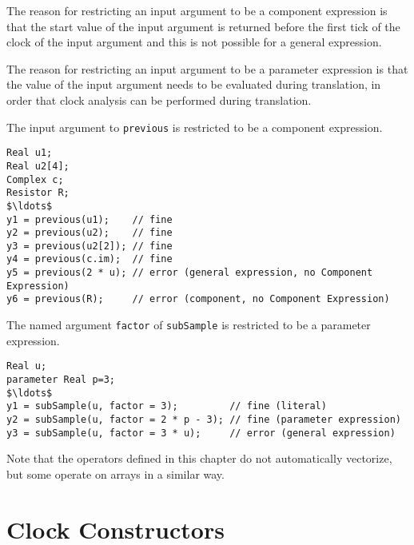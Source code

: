 \begin{nonnormative}
The reason for restricting an input argument to be a component expression is that the start value of the input argument is returned before the first tick of the clock of the input argument and this
is not possible for a general expression.

The reason for restricting an input argument to be a parameter expression is that the value of the input argument needs to be evaluated during translation, in order that clock analysis can be performed during translation.
\end{nonnormative}

\begin{example}
The input argument to \lstinline!previous! is restricted to be a component expression.
\begin{lstlisting}[language=modelica]
Real u1;
Real u2[4];
Complex c;
Resistor R;
$\ldots$
y1 = previous(u1);    // fine
y2 = previous(u2);    // fine
y3 = previous(u2[2]); // fine
y4 = previous(c.im);  // fine
y5 = previous(2 * u); // error (general expression, no Component Expression)
y6 = previous(R);     // error (component, no Component Expression)
\end{lstlisting}
\end{example}

\begin{example}
The named argument \lstinline!factor! of \lstinline!subSample! is restricted to be a parameter expression.
\begin{lstlisting}[language=modelica]
Real u;
parameter Real p=3;
$\ldots$
y1 = subSample(u, factor = 3);         // fine (literal)
y2 = subSample(u, factor = 2 * p - 3); // fine (parameter expression)
y3 = subSample(u, factor = 3 * u);     // error (general expression)
\end{lstlisting}
\end{example}

Note that the operators defined in this chapter do not automatically vectorize,
but some operate on arrays in a similar way.

\section{Clock Constructors}\label{clock-constructors}

